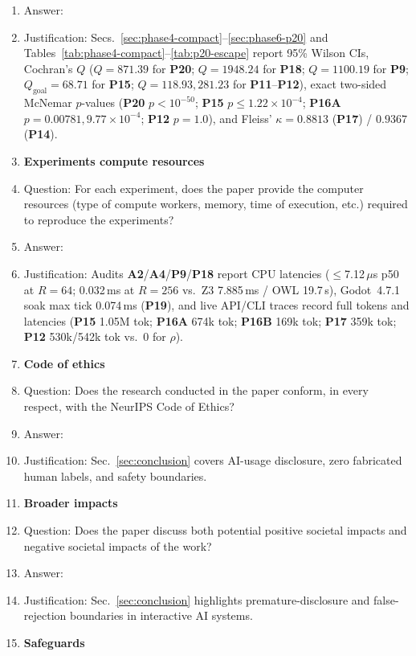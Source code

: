 \documentclass{article}
\begin{document}
\begin{enumerate}
    \item[] Answer: \answerYes{}
    \item[] Justification: Secs.~\ref{sec:phase4-compact}--\ref{sec:phase6-p20} and Tables~\ref{tab:phase4-compact}--\ref{tab:p20-escape} report 95\% Wilson CIs, Cochran's $Q$ ($Q{=}871.39$ for \textbf{P20}; $Q{=}1948.24$ for \textbf{P18}; $Q{=}1100.19$ for \textbf{P9}; $Q_{\mathrm{goal}}{=}68.71$ for \textbf{P15}; $Q{=}118.93, 281.23$ for \textbf{P11}--\textbf{P12}), exact two-sided McNemar $p$-values (\textbf{P20} $p < 10^{-50}$; \textbf{P15} $p{\le}1.22{\times}10^{-4}$; \textbf{P16A} $p{=}0.00781, 9.77{\times}10^{-4}$; \textbf{P12} $p{=}1.0$), and Fleiss' $\kappa{=}0.8813$ (\textbf{P17}) / $0.9367$ (\textbf{P14}).
\item {\bf Experiments compute resources}
    \item[] Question: For each experiment, does the paper provide the computer resources (type of compute workers, memory, time of execution, etc.) required to reproduce the experiments?
    \item[] Answer: \answerYes{}
    \item[] Justification: Audits \textbf{A2}/\textbf{A4}/\textbf{P9}/\textbf{P18} report CPU latencies ($\le$7.12\,$\mu$s p50 at $R{=}64$; 0.032\,ms at $R{=}256$ vs.\ Z3 7.885\,ms / OWL 19.7\,s), Godot~4.7.1 soak max tick 0.074\,ms (\textbf{P19}), and live API/CLI traces record full tokens and latencies (\textbf{P15} 1.05M tok; \textbf{P16A} 674k tok; \textbf{P16B} 169k tok; \textbf{P17} 359k tok; \textbf{P12} 530k/542k tok vs.\ 0 for $\rho$).
\item {\bf Code of ethics}
    \item[] Question: Does the research conducted in the paper conform, in every respect, with the NeurIPS Code of Ethics?
    \item[] Answer: \answerYes{}
    \item[] Justification: Sec.~\ref{sec:conclusion} covers AI-usage disclosure, zero fabricated human labels, and safety boundaries.
\item {\bf Broader impacts}
    \item[] Question: Does the paper discuss both potential positive societal impacts and negative societal impacts of the work?
    \item[] Answer: \answerYes{}
    \item[] Justification: Sec.~\ref{sec:conclusion} highlights premature-disclosure and false-rejection boundaries in interactive AI systems.
\item {\bf Safeguards}

\end{enumerate}
\end{document}
